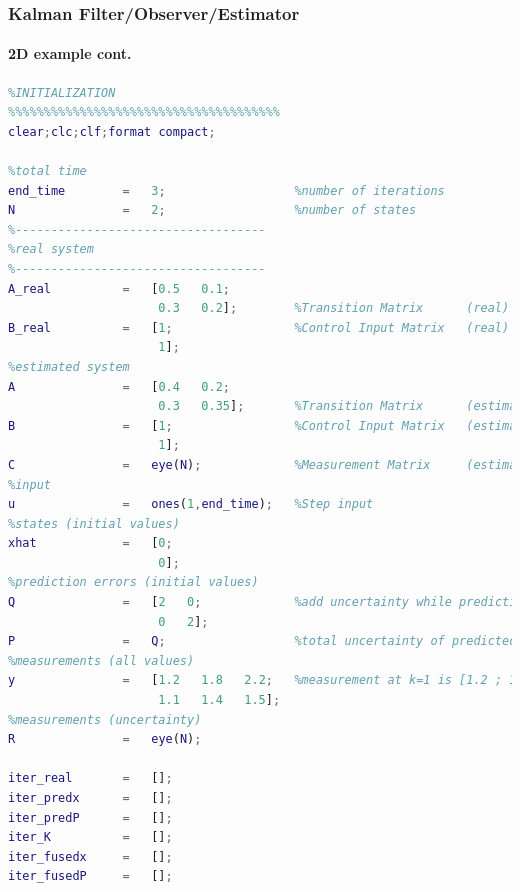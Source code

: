 \begin{frame}[fragile]
\frametitle{Kalman Filter/Observer/Estimator}
\framesubtitle{2D example \tiny cont.}

\tinyvvv \begin{lstlisting}[language=Matlab]
%%%%%%%%%%%%%%%%%%%%%%%%%%%%%%%%%%%%%%
%INITIALIZATION
%%%%%%%%%%%%%%%%%%%%%%%%%%%%%%%%%%%%%%
clear;clc;clf;format compact;

%total time
end_time        =   3;                  %number of iterations  
N               =   2;                  %number of states
%-----------------------------------
%real system
%-----------------------------------
A_real          =   [0.5   0.1;
                     0.3   0.2];        %Transition Matrix      (real)                                
B_real          =   [1;                 %Control Input Matrix   (real)
                     1];
%estimated system                                 
A               =   [0.4   0.2;
                     0.3   0.35];       %Transition Matrix      (estimated)
B               =   [1;                 %Control Input Matrix   (estimated)
                     1];
C               =   eye(N);             %Measurement Matrix     (estimated)
%input
u               =   ones(1,end_time);   %Step input
%states (initial values)
xhat            =   [0;
                     0];                
%prediction errors (initial values)
Q               =   [2   0;             %add uncertainty while predicting
                     0   2];                
P               =   Q;                  %total uncertainty of predicted state
%measurements (all values)
y               =   [1.2   1.8   2.2;   %measurement at k=1 is [1.2 ; 1.1], etc
                     1.1   1.4   1.5];
%measurements (uncertainty)
R               =   eye(N);             

iter_real       =   [];
iter_predx      =   [];   
iter_predP      =   [];   
iter_K          =   [];    
iter_fusedx     =   []; 
iter_fusedP     =   []; 
\end{lstlisting}
\end{frame}




